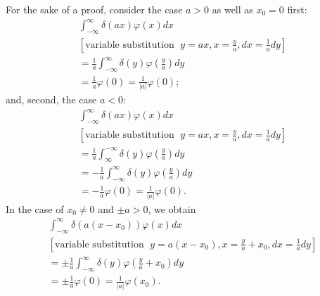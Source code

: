 {\color{OliveGreen}
\bproof
For the sake of a proof,  consider the case $a>0$ as well as $x_0=0$ first:
 \begin{equation}
 \begin{split}
\int _{-\infty}^\infty \delta (ax)  \varphi (x)  dx
\\
  [\textrm{variable substitution }\; y = ax, x=\frac{y}{a}, dx=\frac{1}{a} dy]\\
  =
\frac{1}{a}\int _{-\infty}^\infty \delta (y)  \varphi\left (\frac{y}{a}\right) dy  \\
  =    \frac{1}{a}  \varphi (0)=    \frac{1}{\vert a\vert}  \varphi (0);
 \end{split}
 \end{equation}
and, second, the case $a<0$:
 \begin{equation}
 \begin{split}
\int _{-\infty}^\infty \delta (ax)  \varphi (x)  dx     \\
 [\textrm{variable substitution }\; y = ax, x=\frac{y}{a}, dx=\frac{1}{a} dy]\\
 =
\frac{1}{a}\int _\infty^{-\infty} \delta (y)  \varphi\left (\frac{y}{a}\right) dy \\
 =
- \frac{1}{a}\int _{-\infty}^\infty \delta (y)  \varphi\left (\frac{y}{a}\right) dy       \\
 =   - \frac{1}{a}  \varphi (0)=    \frac{1}{\vert a\vert}  \varphi (0).
 \end{split}
 \end{equation}
In the case of $x_0\neq 0$ and $\pm a>0$, we obtain
\begin{equation}
 \begin{split}
\int _{-\infty}^\infty \delta (a(x-x_0))  \varphi (x)  dx
\\
 [\textrm{variable substitution }\; y = a(x-x_0), x=\frac{y}{a}+x_0, dx=\frac{1}{a} dy]\\
 =
\pm \frac{1}{a}\int _{-\infty}^\infty \delta (y)  \varphi \left(\frac{y}{a}+x_0\right) dy  \\
 =    \pm \frac{1}{a}  \varphi (0)=\frac{1}{|a|}  \varphi (x_0).
 \end{split}
 \end{equation}
\eproof
}


